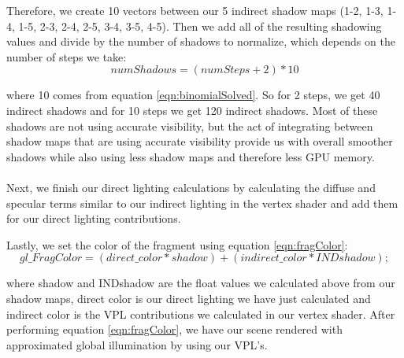 Therefore, we create 10 vectors between our 5 indirect shadow maps (1-2, 1-3, 1-4, 1-5, 2-3, 2-4, 2-5, 3-4, 3-5, 4-5).  Then we add all of the resulting shadowing values and divide by the number of shadows to normalize, which depends on the number of steps we take:
\begin{equation}
numShadows = (numSteps+2)*10\label{eqn:numIndShadows}
\end{equation}

where 10 comes from equation \ref{eqn:binomialSolved}.  So for 2 steps, we get 40 indirect shadows and for 10 steps we get 120 indirect shadows.  Most of these shadows are not using accurate visibility, but the act of integrating between shadow maps that are using accurate visibility provide us with overall smoother shadows while also using less shadow maps and therefore less GPU memory.

\paragraph{}
Next, we finish our direct lighting calculations by calculating the diffuse and specular terms similar to our indirect lighting in the vertex shader and add them for our direct lighting contributions.

Lastly, we set the color of the fragment using equation \ref{eqn:fragColor}:
\begin{equation}
gl\_FragColor = (direct\_color*shadow) + (indirect\_color*INDshadow); \label{eqn:fragColor}
\end{equation}

where shadow and INDshadow are the float values we calculated above from our shadow maps, direct color is our direct lighting we have just calculated and indirect color is the VPL contributions we calculated in our vertex shader.  After performing equation \ref{eqn:fragColor}, we have our scene rendered with approximated global illumination by using our VPL's.
